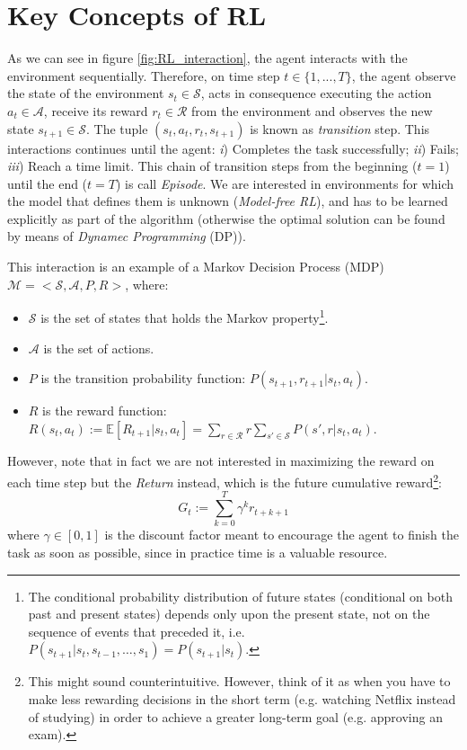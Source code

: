 \documentclass[twoside,twocolumn]{article}
\begin{document}

\section{Key Concepts of RL}

As we can see in figure \ref{fig:RL_interaction}, the agent interacts with the environment sequentially. Therefore, on time step $t \in \{1,...,T\}$, the agent observe the state of the environment $s_t \in \mathcal{S}$, acts in consequence executing the action $a_t \in \mathcal{A}$, receive its reward $r_t \in \mathcal{R}$ from the environment and observes the new state $s_{t+1} \in \mathcal{S}$.
The tuple $(s_t, a_t, r_t, s_{t+1})$ is known as \emph{transition} step.
This interactions continues until the agent: \textit{i}) Completes the task successfully; \textit{ii}) Fails; \textit{iii}) Reach a time limit. This chain of transition steps from the beginning ($t=1$) until the end ($t=T$) is call \emph{Episode}.
We are interested in environments for which the model that defines them is unknown (\emph{Model-free RL}), and has to be learned explicitly as part of the algorithm (otherwise the optimal solution can be found by means of \emph{Dynamec Programming} (DP)).

\noindent This interaction  is an example of a Markov Decision Process (MDP)\cite{Sutton1998} $\mathcal{M}=<\mathcal{S}, \mathcal{A}, P, R>$, where:

\begin{itemize}
    \item $\mathcal{S}$ is the set of states that holds the Markov property\footnote{The conditional probability distribution of future states (conditional on both past and present states) depends only upon the present state, not on the sequence of events that preceded it, i.e. $P(s_{t+1}|s_{t}, s_{t-1},\dots, s_1)=P(s_{t+1}|s_{t})$.}.
    \item $\mathcal{A}$ is the set of actions.
    \item $P$ is the transition probability function: $P(s_{t+1},r_{t+1}|s_t, a_t)$.
    \item $R$ is the reward function: $R(s_t, a_t):=\mathbb{E}[R_{t+1}|s_t,a_t]=\sum_{r\in \mathcal{R}}r \sum_{s' \in \mathcal{S}}P(s',r|s_t, a_t)$.
\end{itemize}

However, note that in fact we are not interested in maximizing the reward on each time step but the \emph{Return} instead, which is the future cumulative reward\footnote{This might sound counterintuitive. However, think of it as when you have to make less rewarding decisions in the short term (e.g. watching Netflix instead of studying) in order to achieve a greater long-term goal (e.g. approving an exam).}:
\begin{equation}
  G_t := \sum_{k=0}^T \gamma^k r_{t+k+1}
\end{equation}
where $\gamma \in [0,1]$ is the discount factor meant to encourage the agent to finish the task as soon as possible, since in practice time is a valuable resource.
\end{document}
